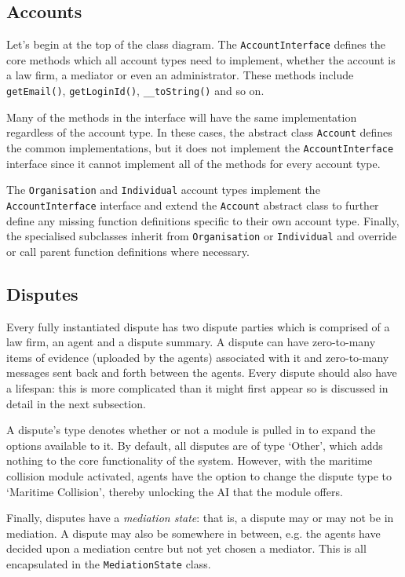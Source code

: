 \subsection{Accounts}

Let's begin at the top of the class diagram. The \lstinline{AccountInterface} defines the core methods which all account types need to implement, whether the account is a law firm, a mediator or even an administrator. These methods include \lstinline{getEmail()}, \lstinline{getLoginId()}, \lstinline{__toString()} and so on.

Many of the methods in the interface will have the same implementation regardless of the account type. In these cases, the abstract class \lstinline{Account} defines the common implementations, but it does not implement the \lstinline{AccountInterface} interface since it cannot implement all of the methods for every account type.

The \lstinline{Organisation} and \lstinline{Individual} account types implement the \lstinline{AccountInterface} interface and extend the \lstinline{Account} abstract class to further define any missing function definitions specific to their own account type. Finally, the specialised subclasses inherit from \lstinline{Organisation} or \lstinline{Individual} and override or call parent function definitions where necessary.

\subsection{Disputes}

Every fully instantiated dispute has two dispute parties which is comprised of a law firm, an agent and a dispute summary. A dispute can have zero-to-many items of evidence (uploaded by the agents) associated with it and zero-to-many messages sent back and forth between the agents. Every dispute should also have a lifespan: this is more complicated than it might first appear so is discussed in detail in the next subsection.

A dispute's type denotes whether or not a module is pulled in to expand the options available to it. By default, all disputes are of type `Other', which adds nothing to the core functionality of the system. However, with the maritime collision module activated, agents have the option to change the dispute type to `Maritime Collision', thereby unlocking the AI that the module offers.

Finally, disputes have a \emph{mediation state}: that is, a dispute may or may not be in mediation. A dispute may also be somewhere in between, e.g. the agents have decided upon a mediation centre but not yet chosen a mediator. This is all encapsulated in the \lstinline{MediationState} class.

